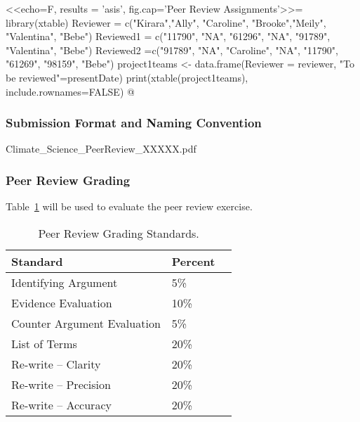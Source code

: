 <<echo=F, results = 'asis', fig.cap='Peer Review Assignments'>>=
library(xtable)
Reviewer = c("Kirara","Ally", "Caroline", "Brooke","Meily", "Valentina", "Bebe")
Reviewed1 = c("11790", "NA", "61296",     "NA",   "91789",  "Valentina", "Bebe")
Reviewed2 =c("91789", "NA", "Caroline", "NA", "11790", "61269", "98159", "Bebe")
project1teams <- data.frame(Reviewer = reviewer, "To be reviewed"=presentDate)
print(xtable(project1teams), include.rownames=FALSE)
@

\subsubsection{Submission Format and Naming Convention}

Climate\_Science\_PeerReview\_XXXXX.pdf

\subsubsection{Peer Review Grading}

Table~\ref{tab:peerreviewgrading} will be used to evaluate the peer review exercise. 

\begin{table}[h]
\caption{Peer Review Grading Standards.}
\label{tab:peerreviewgrading}
\begin{tabular}{lll}\hline
Standard                      &   Percent   & \\ 
\hline\hline
Identifying Argument          &   5\%      & \\
Evidence Evaluation           &   10\%      & \\
Counter Argument Evaluation & 5\%    & \\
List of Terms               & 20\%    & \\
Re-write -- Clarity         & 20\%    & \\
Re-write -- Precision       & 20\%    & \\
Re-write -- Accuracy        & 20\%    & \\

\hline
\end{tabular}
\end{table}

